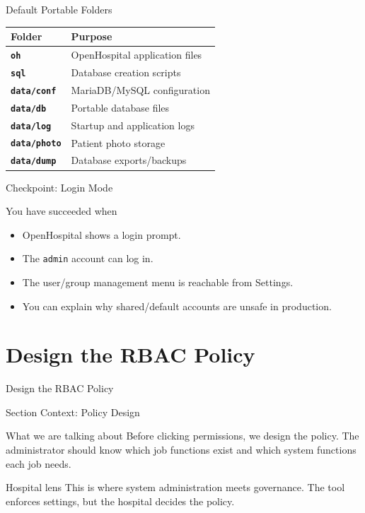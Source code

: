 \documentclass[presentation]{beamer}
\newcommand{\sectiontitleframe}[1]{
\begin{frame}[plain,c]
\begin{center}
{\usebeamerfont{title}\usebeamercolor[fg]{title}#1}
\end{center}
\end{frame}
}
\begin{document}
\begin{frame}[c]{Default Portable Folders}
\begin{center}
\scriptsize
\renewcommand{\arraystretch}{1.2}
\begin{tabular}{>{\bfseries}p{} p{}}
\toprule
Folder & Purpose \\
\midrule
\texttt{oh} & OpenHospital application files \\
\texttt{sql} & Database creation scripts \\
\texttt{data/conf} & MariaDB/MySQL configuration \\
\texttt{data/db} & Portable database files \\
\texttt{data/log} & Startup and application logs \\
\texttt{data/photo} & Patient photo storage \\
\texttt{data/dump} & Database exports/backups \\
\bottomrule
\end{tabular}
\end{center}
\end{frame}

\begin{frame}[c]{Checkpoint: Login Mode}
\begin{block}{You have succeeded when}
\begin{itemize}
    \item OpenHospital shows a login prompt.
    \item The \texttt{admin} account can log in.
    \item The user/group management menu is reachable from Settings.
    \item You can explain why shared/default accounts are unsafe in production.
\end{itemize}
\end{block}
\end{frame}

\section{Design the RBAC Policy}
\sectiontitleframe{Design the RBAC Policy}

\begin{frame}[c]{Section Context: Policy Design}
\begin{block}{What we are talking about}
Before clicking permissions, we design the policy. The administrator should know which job functions
exist and which system functions each job needs.
\end{block}

\begin{exampleblock}{Hospital lens}
This is where system administration meets governance. The tool enforces settings, but the hospital
decides the policy.
\end{exampleblock}
\end{frame}
\end{document}
